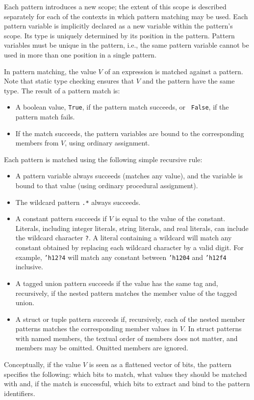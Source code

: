 \documentclass[twoside,letterpaper]{article}
\newcommand{\te}[1]{\texttt{#1}}
\begin{document}
Each pattern introduces a new scope; the extent of this scope is
described separately for each of the contexts in which pattern
matching may be used.  Each pattern variable is implicitly declared as
a new variable within the pattern's scope.  Its type is uniquely
determined by its position in the pattern.  Pattern variables must be
unique in the pattern, i.e., the same pattern variable cannot be used
in more than one position in a single pattern.

In pattern matching, the value $V$ of an expression is matched against
a pattern.  Note that static type checking ensures that $V$ and the
pattern have the same type.  The result of a pattern match is:
\begin{itemize}

\item
A boolean value, \texttt{True}, if the pattern match succeeds, or {\tt
False}, if the pattern match fails.

\item If the match succeeds, the pattern variables are bound to the
corresponding members from $V$, using ordinary assignment.

\end{itemize}
Each pattern is matched using the following simple recursive rule:
\begin{itemize}
\item
A pattern variable always succeeds (matches any value), and the
variable is bound to that value (using ordinary procedural
assignment).

\item
The wildcard pattern \texttt{.*} always succeeds.

\item
A constant pattern succeeds if $V$ is equal to the value of the
constant. Literals, including integer literals, string literals, and
real literals, can 
include the wildcard character \te{?}.  
A literal containing a wildcard will match any
constant obtained by replacing each wildcard character by a valid
digit.  For example, \te{'h12?4} will match any constant between
\te{'h1204} and \te{'h12f4} inclusive.

\item
A tagged union pattern succeeds if the value has the same tag and,
recursively, if the nested pattern matches the member value of the
tagged union.

\item
A struct or tuple pattern succeeds if, recursively, each of the nested
member patterns matches the corresponding member values in $V$.  In
struct patterns with named members, the textual order of members does
not matter, and members may be omitted.  Omitted members are ignored.

\end{itemize}
Conceptually, if the value $V$ is seen as a flattened vector of bits,
the pattern specifies the following: which bits to match, what values
they should be matched with and, if the match is successful, which
bits to extract and bind to the pattern identifiers.
\end{document}
